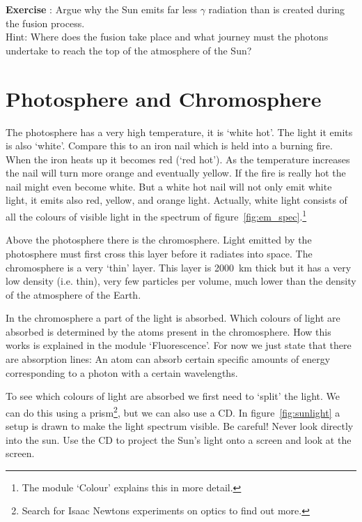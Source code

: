 \begin{shaded}
\textbf{Exercise \theExercise {}} : Argue why the Sun emits far less $\gamma$ radiation than is created during the fusion process. \\ Hint: Where does the fusion take place and what journey must the photons undertake to reach the top of the atmosphere of the Sun?\end{shaded}

\section{Photosphere and Chromosphere}
The photosphere has a very high temperature, it is `white hot'. The light it emits is also `white'. Compare this to an iron nail which is held into a burning fire. When the iron heats up it becomes red (`red hot'). As the temperature increases the nail will turn more orange and eventually yellow. If the fire is really hot the nail might even become white. But a white hot nail will not only emit white light, it emits also red, yellow, and orange light. Actually, white light consists of all the colours of visible light in the spectrum of figure~\ref{fig:em_spec}.\footnote{The module `Colour' explains this in more detail.}

Above the photosphere there is the chromosphere. Light emitted by the photosphere must first cross this layer before it radiates into space. The chromosphere is a very `thin' layer. This layer is 2000~km thick but it has a very low density (i.e. thin), very few particles per volume, much lower than the density of the atmosphere of the Earth.

In the chromosphere a part of the light is absorbed. Which colours of light are absorbed is determined by the atoms present in the chromosphere. How this works is explained in the module `Fluorescence'. For now we just state that there are absorption lines: An atom can absorb certain specific amounts of energy corresponding to a photon with a certain wavelengths.

To see which colours of light are absorbed we first need to `split' the light. We can do this using a prism\footnote{Search for Isaac Newtons experiments on optics to find out more.}, but we can also use a CD. In figure~\ref{fig:sunlight} a setup is drawn to make the light spectrum visible. Be careful! Never look directly into the sun. Use the CD to project the Sun's light onto a screen and look at the screen.

